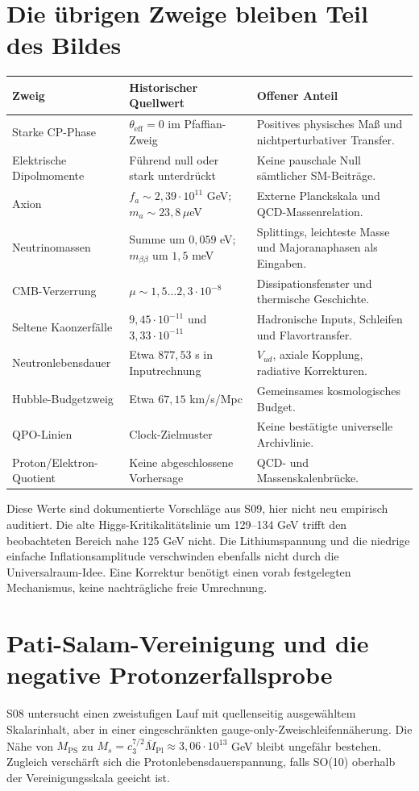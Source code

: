 \section{Die übrigen Zweige bleiben Teil des Bildes}
\begin{longtable}{L{41mm}L{46mm}L{63mm}}
\toprule \textbf{Zweig}&\textbf{Historischer Quellwert}&\textbf{Offener Anteil}\\\midrule\endhead
Starke CP-Phase&$\theta_{\mathrm{eff}}=0$ im Pfaffian-Zweig&Positives physisches Maß und nichtperturbativer Transfer.\\
Elektrische Dipolmomente&Führend null oder stark unterdrückt&Keine pauschale Null sämtlicher SM-Beiträge.\\
Axion&$f_a\sim2{,}39\cdot10^{11}$ GeV; $m_a\sim23{,}8\,\mu$eV&Externe Planckskala und QCD-Massenrelation.\\
Neutrinomassen&Summe um $0{,}059$ eV; $m_{\beta\beta}$ um $1{,}5$ meV&Splittings, leichteste Masse und Majoranaphasen als Eingaben.\\
CMB-Verzerrung&$\mu\sim1{,}5\ldots2{,}3\cdot10^{-8}$&Dissipationsfenster und thermische Geschichte.\\
Seltene Kaonzerfälle&$9{,}45\cdot10^{-11}$ und $3{,}33\cdot10^{-11}$&Hadronische Inputs, Schleifen und Flavortransfer.\\
Neutronlebensdauer&Etwa $877{,}53$ s in Inputrechnung&$V_{ud}$, axiale Kopplung, radiative Korrekturen.\\
Hubble-Budgetzweig&Etwa $67{,}15$ km/s/Mpc&Gemeinsames kosmologisches Budget.\\
QPO-Linien&Clock-Zielmuster&Keine bestätigte universelle Archivlinie.\\
Proton/Elektron-Quotient&Keine abgeschlossene Vorhersage&QCD- und Massenskalenbrücke.\\\bottomrule
\end{longtable}
Diese Werte sind dokumentierte Vorschläge aus S09, hier nicht neu empirisch auditiert. Die alte Higgs-Kritikalitätslinie um 129--134 GeV trifft den beobachteten Bereich nahe 125 GeV nicht. Die Lithiumspannung und die niedrige einfache Inflationsamplitude verschwinden ebenfalls nicht durch die Universalraum-Idee. Eine Korrektur benötigt einen vorab festgelegten Mechanismus, keine nachträgliche freie Umrechnung.

\section{Pati-Salam-Vereinigung und die negative Protonzerfallsprobe}
S08 untersucht einen zweistufigen Lauf mit quellenseitig ausgewähltem Skalarinhalt, aber in einer eingeschränkten gauge-only-Zweischleifennäherung. Die Nähe von $M_{\mathrm{PS}}$ zu $M_s=c_3^{7/2}\overline M_{\mathrm{Pl}}\approx3{,}06\cdot10^{13}$ GeV bleibt ungefähr bestehen. Zugleich verschärft sich die Protonlebensdauerspannung, falls SO(10) oberhalb der Vereinigungsskala geeicht ist.

